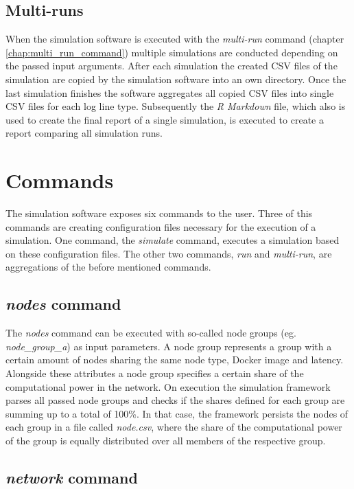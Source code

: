 \subsection{Multi-runs}

When the simulation software is executed with the \textit{multi-run} command (chapter \ref{chap:multi_run_command}) multiple simulations are conducted depending on the passed input arguments.
After each simulation the created CSV files of the simulation are copied by the simulation software into an own directory.
Once the last simulation finishes the software aggregates all copied CSV files into single CSV files for each log line type.
Subsequently the \textit{R Markdown} file, which also is used to create the final report of a single  simulation, is executed to create a report comparing all simulation runs.
 
\section{Commands}
\label{chap:commands}

The simulation software exposes six commands to the user.
Three of this commands are creating configuration files necessary for the execution of a simulation. One command, the \textit{simulate} command, executes a simulation based on these configuration files.
The other two commands, \textit{run} and \textit{multi-run}, are aggregations of the before mentioned commands.

\subsection{\textit{nodes} command} \label{chap:nodes_command}

The \textit{nodes} command can be executed with so-called node groups (eg. \textit{node\_group\_a}) as input parameters.
A node group represents a group with a certain amount of nodes sharing the same node type, Docker image and latency.
Alongside these attributes a node group specifies a certain share of the computational power in the network.
On execution the simulation framework parses all passed node groups and checks if the shares defined for each group are summing up to a total of 100\%.
In that case, the framework persists the nodes of each group in a file called \textit{node.csv}, where the share of the computational power of the group is equally distributed over all members of the respective group.

\subsection{\textit{network} command} \label{chap:network_command}

